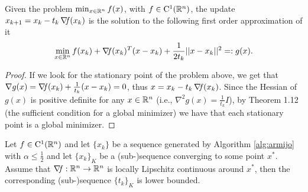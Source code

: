 \documentclass[10pt,a4paper]{article}
\begin{document}
\begin{lemma}\label{lemma:mirror_descent}
	Given the problem $\min_{x\in\mathbb{R}^n} f(x)$, with $f\in \mathord{\mathrm{C^1}}(\mathbb{R}^n)$, the update $x_{k+1} = x_k - t_k \operatorname*{\mathit{\nabla \!f}}(x_k)$ is the solution to the following first order approximation of it
	\begin{equation}\label{eq:mirror_descent}
		\min_{x\in \mathbb{R}^n} f(x_k) + \operatorname*{\mathit{\nabla \!f}}(x_k)^T(x-x_k) + \frac{1}{2t_k} ||x-x_k||^2 =:g(x).
	\end{equation}
\end{lemma}
\begin{proof}
	If we look for the stationary point of the problem above, we get that $\nabla g(x) = \operatorname*{\mathit{\nabla \!f}}(x_k) + \frac{1}{t_k}(x-x_k)=0$, thus $x = x_k - t_k \operatorname*{\mathit{\nabla \!f}}(x_k)$. Since the Hessian of $g(x)$ is positive definite for any $x \in \mathbb{R}^n$ (i.e., $\nabla^2 g(x) = \frac{1}{t_k}I $), by Theorem 1.12 (the sufficient condition for a global minimizer) we have that each stationary point is a global minimizer. 
\end{proof}

\begin{proposition}
	Let $f\in \mathord{\mathrm{C^1}}(\mathbb{R}^n)$ and let $\{x_k\}$ be a sequence generated by Algorithm \ref{alg:armijo} with $\alpha\leq \frac{1}{2}$ and let $\{x_k\}_K$ be a (sub-)sequence converging to some point $x^*$. Assume that $\operatorname*{\mathit{\nabla \!f}}:\mathbb{R}^n\to\mathbb{R}^n$ is locally Lipschitz continuous around $x^*$, then the corresponding (sub-)sequence $\{t_k\}_K$ is lower bounded.
\end{proposition}
\end{document}
